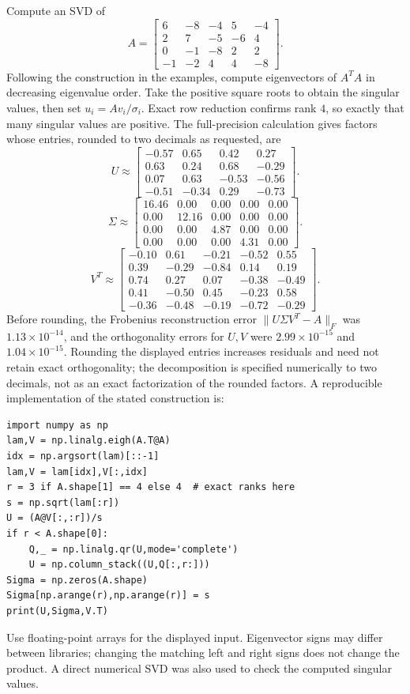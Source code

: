 \goal Compute an SVD of
\[A=\begin{bmatrix}6&-8&-4&5&-4\\2&7&-5&-6&4\\0&-1&-8&2&2\\-1&-2&4&4&-8\end{bmatrix}.\]
Following the construction in the examples, compute eigenvectors of $A^TA$ in decreasing eigenvalue order. Take the positive square roots to obtain the singular values, then set $u_i=Av_i/\sigma_i$. Exact row reduction confirms rank $4$, so exactly that many singular values are positive. The full-precision calculation gives factors whose entries, rounded to two decimals as requested, are
\[U\approx\begin{bmatrix}-0.57&0.65&0.42&0.27\\0.63&0.24&0.68&-0.29\\0.07&0.63&-0.53&-0.56\\-0.51&-0.34&0.29&-0.73\end{bmatrix}.\]
\[\Sigma\approx\begin{bmatrix}16.46&0.00&0.00&0.00&0.00\\0.00&12.16&0.00&0.00&0.00\\0.00&0.00&4.87&0.00&0.00\\0.00&0.00&0.00&4.31&0.00\end{bmatrix}.\]
\[V^T\approx\begin{bmatrix}-0.10&0.61&-0.21&-0.52&0.55\\0.39&-0.29&-0.84&0.14&0.19\\0.74&0.27&0.07&-0.38&-0.49\\0.41&-0.50&0.45&-0.23&0.58\\-0.36&-0.48&-0.19&-0.72&-0.29\end{bmatrix}.\]
Before rounding, the Frobenius reconstruction error $\|U\Sigma V^T-A\|_F$ was $1.13\times10^{-14}$, and the orthogonality errors for $U,V$ were $2.99\times10^{-15}$ and $1.04\times10^{-15}$. Rounding the displayed entries increases residuals and need not retain exact orthogonality; the decomposition is specified numerically to two decimals, not as an exact factorization of the rounded factors.
A reproducible implementation of the stated construction is:
\begin{verbatim}
import numpy as np
lam,V = np.linalg.eigh(A.T@A)
idx = np.argsort(lam)[::-1]
lam,V = lam[idx],V[:,idx]
r = 3 if A.shape[1] == 4 else 4  # exact ranks here
s = np.sqrt(lam[:r])
U = (A@V[:,:r])/s
if r < A.shape[0]:
    Q,_ = np.linalg.qr(U,mode='complete')
    U = np.column_stack((U,Q[:,r:]))
Sigma = np.zeros(A.shape)
Sigma[np.arange(r),np.arange(r)] = s
print(U,Sigma,V.T)
\end{verbatim}
Use floating-point arrays for the displayed input. Eigenvector signs may differ between libraries; changing the matching left and right signs does not change the product. A direct numerical SVD was also used to check the computed singular values.

